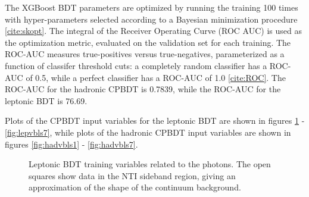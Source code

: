 The XGBoost BDT parameters are optimized by running the training 100 times with hyper-parameters selected according to a Bayesian minimization procedure \ref{cite:skopt}. The integral of the Receiver Operating Curve (ROC AUC) is used as the optimization metric, evaluated on the validation set for each training. The ROC-AUC measures true-positives versus true-negatives, parameterized as a function of classifer threshold cuts: a completely random classifier has a ROC-AUC of 0.5, while a perfect classifier has a ROC-AUC of 1.0 \ref{cite:ROC}. The ROC-AUC for the hadronic CPBDT is 0.7839, while the ROC-AUC for the leptonic BDT is 76.69.

Plots of the CPBDT input variables for the leptonic BDT are shown in figures \ref{fig:lepvbls1} -  \ref{fig:lepvbls7}, while plots of the hadronic CPBDT input variables are shown in figures \ref{fig:hadvbls1} -  \ref{fig:hadvbls7}.

\begin{figure}[htbp]
  \centering
  \caption{Leptonic BDT training variables related to the photons. The open squares show data in the NTI sideband region, giving an approximation of the shape of the continuum background. }
  \label{fig:lepvbls1}
\end{figure}

